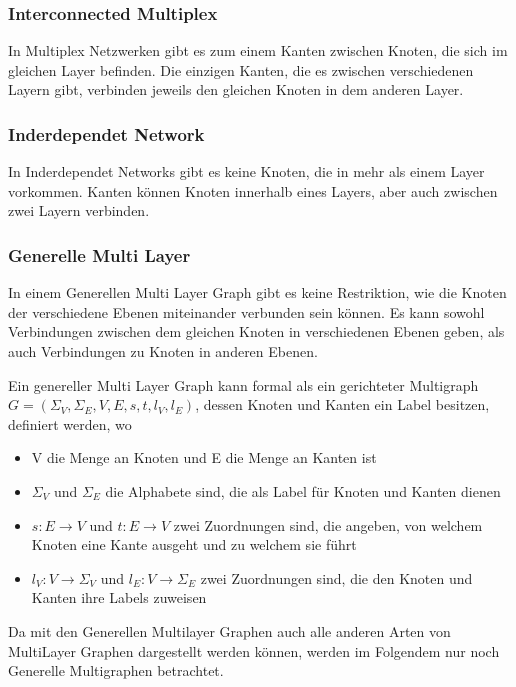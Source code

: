 \subsubsection{Interconnected Multiplex}

In Multiplex Netzwerken gibt es zum einem Kanten zwischen Knoten, die sich im gleichen Layer befinden. Die einzigen Kanten, die es zwischen verschiedenen Layern gibt, verbinden jeweils den gleichen Knoten in dem anderen Layer. 

\subsubsection{Inderdependet Network}

In Inderdependet Networks gibt es keine Knoten, die in mehr als einem Layer vorkommen. Kanten können Knoten innerhalb eines Layers, aber auch zwischen zwei Layern verbinden.

\subsubsection{Generelle Multi Layer}
In einem Generellen Multi Layer Graph gibt es keine Restriktion, wie die Knoten der verschiedene Ebenen miteinander verbunden sein können. Es kann sowohl Verbindungen zwischen dem gleichen Knoten in verschiedenen Ebenen geben, als auch Verbindungen zu Knoten in anderen Ebenen.


Ein genereller Multi Layer Graph kann formal als ein gerichteter Multigraph\cite{article} $G = (\Sigma_{V}, \Sigma_{E}, V, E, s, t, l_{V}, l_{E})$, dessen Knoten und Kanten ein Label besitzen, definiert werden, wo

\begin{itemize}
  \item V die Menge an Knoten und E die Menge an Kanten ist
  \item $\Sigma_{V}$ und $\Sigma_{E}$ die Alphabete sind, die als Label für Knoten und Kanten dienen
  \item $s: E \rightarrow V$ und $t: E \rightarrow V$ zwei Zuordnungen sind, die angeben, von welchem Knoten eine Kante ausgeht und zu welchem sie führt
  \item $l_{V}: V \rightarrow \Sigma_{V}$ und $l_{E}: V \rightarrow \Sigma_{E}$ zwei Zuordnungen sind, die den Knoten und Kanten ihre Labels zuweisen
\end{itemize}

Da mit den Generellen Multilayer Graphen auch alle anderen Arten von MultiLayer Graphen dargestellt werden können, werden im Folgendem nur noch Generelle Multigraphen betrachtet.
